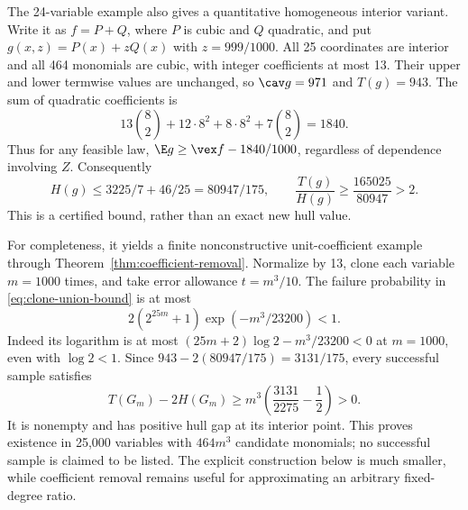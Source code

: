 The 24-variable example also gives a quantitative homogeneous interior
variant. Write it as $f=P+Q$, where $P$ is cubic and $Q$ quadratic,
and put $g(x,z)=P(x)+zQ(x)$ with $z=999/1000$.
All 25 coordinates are interior and all 464 monomials are cubic, with
integer coefficients at most 13. Their upper and lower termwise values
are unchanged, so $\cav g=971$ and $T(g)=943$.
The sum of quadratic coefficients is
\[
 13\binom82+12\cdot8^2+8\cdot8^2+7\binom82=1840.
\]
Thus for any feasible law,
$\E g\ge\vex f-1840/1000$, regardless of dependence involving $Z$.
Consequently
\begin{equation}\label{eq:homogeneous-25}
 H(g)\le3225/7+46/25=80947/175,\qquad
 \frac{T(g)}{H(g)}\ge\frac{165025}{80947}>2.
\end{equation}
This is a certified bound, rather than an exact new hull value.

For completeness, it yields a finite nonconstructive unit-coefficient
example through Theorem~\ref{thm:coefficient-removal}. Normalize by 13,
clone each variable $m=1000$ times, and take error allowance $t=m^3/10$.
The failure probability in \eqref{eq:clone-union-bound} is at most
\begin{equation}\label{eq:finite-25000-probability}
 2(2^{25m}+1)\exp(-m^3/23200)<1.
\end{equation}
Indeed its logarithm is at most $(25m+2)\log2-m^3/23200<0$ at $m=1000$,
even with $\log2<1$. Since $943-2(80947/175)=3131/175$, every
successful sample satisfies
\begin{equation}\label{eq:finite-25000-margin}
 T(G_m)-2H(G_m)\ge m^3\left(\frac{3131}{2275}-\frac12\right)>0.
\end{equation}
It is nonempty and has positive hull gap at its interior point. This
proves existence in 25,000 variables with $464m^3$ candidate monomials;
no successful sample is claimed to be listed. The explicit construction
below is much smaller, while coefficient removal remains useful for
approximating an arbitrary fixed-degree ratio.

